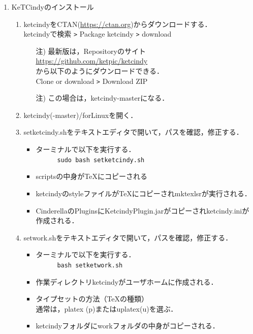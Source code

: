 \documentclass{ujarticle}
\begin{document}
\begin{enumerate}[\bf\large 1.]
\item KeTCindyのインストール
  \begin{enumerate}[(1)]
  \item ketcindyをCTAN(\url{https://ctan.org})からダウンロードする．\\
  \hspace*{10mm}ketcindyで検索 \verb|>| Package ketcindy \verb|>| download
    \begin{itemize}
    \item[注)]最新版は，Repositoryのサイト\\
        \hspace*{10mm}\url{https://github.com/ket­pic/ketcindy}\\
       から以下のようにダウンロードできる．\\
        \hspace*{10mm}Clone or download \verb|>| Download ZIP
    \item[注)]この場合は，ketcindy-masterになる．
    \end{itemize}
  \item ketcindy(-master)/forLinuxを開く．
  \item setketcindy.shをテキストエディタで開いて，パスを確認，修正する．
    \begin{itemize}
    \item ターミナルで以下を実行する．\\
　　　\verb|sudo bash setketcindy.sh|
    \item scriptsの中身がTeXにコピーされる
    \item ketcindyのstyleファイルがTeXにコピーされmktexlsrが実行される．
    \item CinderellaのPluginsにKetcindyPlugin.jarがコピーされketcindy.iniが作成される．
    \end{itemize}
  \item setwork.shをテキストエディタで開いて，パスを確認，修正する．
    \begin{itemize}
    \item ターミナルで以下を実行する．\\
　　　\verb|bash setketwork.sh|
    \item 作業ディレクトリketcindyがユーザホームに作成される．
    \item タイプセットの方法（\TeX の種類）\\
    \hspace*{10mm}通常は，platex (p)またはuplatex(u)を選ぶ．
    \item ketcindyフォルダにworkフォルダの中身がコピーされる．

\end{itemize}
\end{enumerate}
\end{enumerate}
\end{document}
